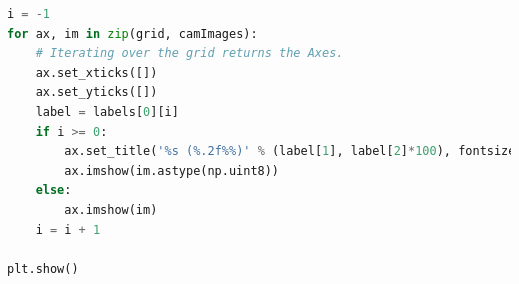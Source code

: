 \documentclass[
  12pt, %
  a4paper, %
  oneside, %
  openany, 
  numbers=noenddot, %
  BCOR=5mm, %
  parskip=half*, %
  thesis, %
]{bfhbook}
\begin{document}
\begin{lstlisting}[language=Python, caption=Visualisierungen der fünf wahrscheinlichsten Klassen mit verschiedenen Verfahren]
i = -1
for ax, im in zip(grid, camImages):
    # Iterating over the grid returns the Axes.
    ax.set_xticks([])
    ax.set_yticks([])
    label = labels[0][i]
    if i >= 0:
        ax.set_title('%s (%.2f%%)' % (label[1], label[2]*100), fontsize=20)
        ax.imshow(im.astype(np.uint8))
    else:
        ax.imshow(im)
    i = i + 1

plt.show()
\end{lstlisting}

\appendix
\printglossary[type=\acronymtype]
\printglossary[type=main]
\listoffigures
\begingroup
\let\clearpage\relax
\listoftables
\printbibliography[type=article,title={Literaturverzeichnis Artikel}]

\printbibliography[type=book,title={Literaturverzeichnis Bücher}]

\printbibliography[type=misc,title={Linkverzeichnis}]
\lstlistoflistings
\endgroup
\end{document}
